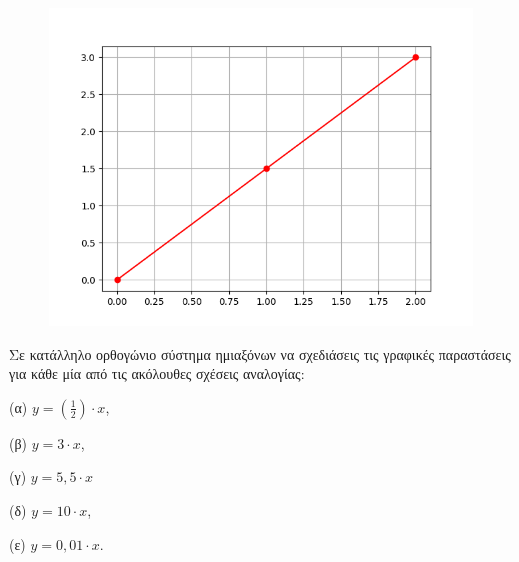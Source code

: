 \begin{figure}
\includegraphics{sel101_1a.png}
\end{figure}

\begin{exercise}
Σε κατάλληλο ορθογώνιο σύστημα ημιαξόνων να σχεδιάσεις τις γραφικές παραστάσεις για κάθε μία από τις ακόλουθες σχέσεις αναλογίας: 

(α)	$y = \left(\frac{1}{2}\right)\cdot x$,	

(β)	$y = 3 \cdot x$,	

(γ)	$y =	5,5	\cdot x$

(δ)	$y =	10\cdot x$,	

(ε) $y  =	0,01 \cdot x$.
\end{exercise}

